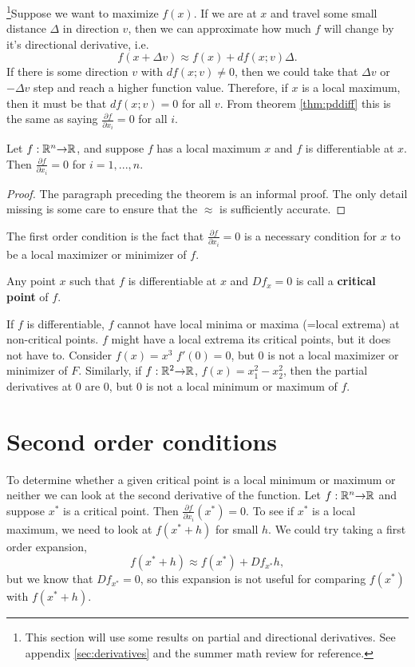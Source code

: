 \footnote{This section will use some results on partial and
  directional derivatives. See appendix \ref{sec:derivatives} and the
  summer math review for reference.}Suppose we want to maximize
$f(x)$. If we are at $x$ and travel some small distance $\Delta$ in
direction $v$, then we can approximate how much $f$ will change by
it's directional derivative, i.e.\
\[ f(x + \Delta v) \approx f(x) + df(x;v) \Delta. \]
If there is some direction $v$ with $df(x;v) \neq 0$, then we could
take that $\Delta v$ or $-\Delta v$ step and reach a higher function
value. Therefore, if $x$ is a local maximum, then it must be that
$df(x;v) = 0$ for all $v$. From theorem \ref{thm:pddiff} this is the
same as saying $\frac{\partial f}{\partial x_i} = 0$ for all $i$.
\begin{theorem}
  Let $f: \mathbb{R}^n {\rightarrow} \mathbb{R}$,  and suppose $f$ has a local
  maximum $x$ and $f$ is differentiable at $x$. Then $\frac{\partial
    f}{\partial x_i} = 0$ for $i = 1, ..., n$.
\end{theorem}
\begin{proof}
  The paragraph preceding the theorem is an informal proof. The only
  detail missing is some care to ensure that the $\approx$ is
  sufficiently accurate. %
\end{proof}
The first order condition is the fact that $\frac{\partial f}{\partial
  x_i}= 0$ is a necessary condition for $x$ to be a local maximizer
or minimizer of $f$.
\begin{definition}
  Any point $x$ such that $f$ is differentiable at $x$ and
  $Df_x = 0$ is call a \textbf{critical
    point} of $f$.
\end{definition}
If $f$ is differentiable, $f$ cannot have local minima or maxima
(=local extrema) at non-critical points. $f$ might have a local
extrema its critical points, but it does not have to. Consider $f(x) =
x^3$ $f'(0) = 0$, but $0$ is not a local maximizer or minimizer of
$F$. Similarly, if $f:\mathbb{R}^2 {\rightarrow} \mathbb{R}$, $f(x) = x_1^2 - x_2^2$, then the
partial derivatives at $0$ are $0$, but $0$ is not a local minimum or
maximum of $f$.

\section{Second order conditions}

To determine whether a given critical point is a local minimum or
maximum or neither we can look at the second derivative of the
function. Let $f:\mathbb{R}^n {\rightarrow} \mathbb{R}$ and suppose $x^*$ is a critical
point. Then $\frac{\partial f}{\partial x_i}(x^*) = 0$. To see if
$x^*$ is a local maximum, we need to look at $f(x^* + h)$ for small
$h$. We could try taking a first order expansion,
\[ f(x^* + h) \approx f(x^*) + Df_{x^*} h, \]
but we know that $Df_{x^*} = 0$, so this expansion is not useful for
comparing $f(x^*)$ with $f(x^* + h)$. 

